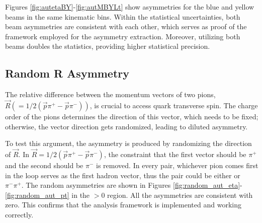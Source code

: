 Figures \ref{fig:autetaBY}-\ref{fig:autMBYLt} show asymmetries for the blue and yellow beams in the same kinematic bins. Within the statistical uncertainties, both beam asymmetries are consistent with each other, which serves as proof of the framework employed for the asymmetry extraction. Moreover, utilizing both beams doubles the statistics, providing higher statistical precision.








\clearpage
\subsection{Random \textbf{R} Asymmetry}
\label{app:randomaut}
The relative difference between the momentum vectors of two pions, $\vec{R} (=1/2(\vec{p}{\pi^+} - \vec{p}{\pi^-}))$, is crucial to access quark transverse spin. The charge order of the pions determines the direction of this vector, which needs to be fixed; otherwise, the vector direction gets randomized, leading to diluted asymmetry.

To test this argument, the asymmetry is produced by randomizing the direction of $\vec{R}$. In $\vec{R} =1/2(\vec{p}{\pi^+} - \vec{p}{\pi^-})$, the constraint that the first vector should be $\pi^+$ and the second should be $\pi^-$ is removed. In every pair, whichever pion comes first in the loop serves as the first hadron vector, thus the pair could be either \dipion or $\pi^-\pi^+$. The random asymmetries are shown in Figures \ref{fig:random_aut_eta}-\ref{fig:random_aut_pt} in the \etap$>0$ region. All the asymmetries are consistent with zero. This confirms that the analysis framework is implemented and working correctly.


